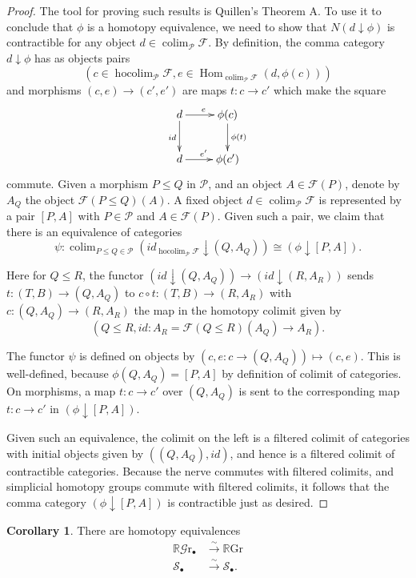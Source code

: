 \documentclass[draftthesis,tocnosub,noragright,centerchapter,10pt]{uiucthesis2009}
\newcommand{\mc}{\mathcal}
\newcommand{\RGr}{\mathbb R\mathrm{Gr}}
\newcommand{\hRGr}{\mathbb R\mathscr{G}{\mathrm{r}}}
\DeclareMathOperator*{\hocolim}{hocolim}
\DeclareMathOperator*{\colim}{colim}
\DeclareMathOperator{\Hom}{Hom}
\theoremstyle{plain}
\theoremstyle{definition}
\newtheorem{corollary}[lemma]{Corollary}
\begin{document}
\begin{proof}
The tool for proving such results is Quillen's Theorem A. To use it to
conclude that $\phi$ is a homotopy equivalence, we need to show that
$N(d \downarrow \phi)$ is contractible for any object $d \in \colim_{\mathscr
  P} \mathscr F$. By definition, the comma category $d \downarrow
\phi$ has as objects pairs 
\[
 (c \in \hocolim_{\mathscr P} \mathscr F, e \in \Hom_{\colim_{\mathscr
  P} \mathscr F}(d, \phi(c)))
\] 
and morphisms $(c,e) \rightarrow (c',e')$ are maps $t: c \rightarrow c'$
which make the square
\[
\xymatrix{d \ar[r]^e \ar[d]_{id} & \phi(c) \ar[d]^{\phi(t)} \\ d \ar[r]^{e'} & \phi(c')} 
\]
commute. Given a morphism $P \leq Q$ in $\mathscr P$, and an object $A
\in \mathscr F(P)$, denote by $A_Q$
the object
$\mathscr F(P\leq Q)(A)$. A fixed object $d \in \colim_{\mathscr
  P} \mathscr F$ is represented by a pair $[P,A]$ with $P \in \mathscr
P$ and $A \in \mathscr F(P)$. Given such a pair, we claim that there
is an equivalence of categories
\[
\psi : \colim_{P \leq Q \in \mathscr P}(id_{\hocolim_{\mathscr P} \mathscr F} \downarrow (Q,A_Q)) \cong (\phi \downarrow [P,A]).
\]

Here for $Q \leq R$, the functor $(id \downarrow (Q,A_Q)) \rightarrow
(id \downarrow (R,A_R))$ sends $t : (T,B) \rightarrow (Q,A_Q)$ to $c
\circ t : (T,B) \rightarrow (R,A_R)$ with $c : (Q,A_Q) \rightarrow
(R,A_R)$ the map in the homotopy colimit given by 
\[
(Q \leq R,id: A_R = \mathscr F(Q \leq R)(A_Q)
\rightarrow A_R).
\]

The functor $\psi$ is defined on objects by $(c,e: c\rightarrow
(Q,A_Q)) \mapsto (c,e)$. This is well-defined, because $\phi(Q,A_Q) =
[P,A]$ by definition of colimit of categories. On morphisms, a map $t:
c \rightarrow c'$ over $(Q,A_Q)$ is sent to the corresponding map $t :
c \rightarrow c'$ in $(\phi \downarrow [P,A])$.

Given such an equivalence, the colimit on the left is a filtered
colimit of categories with initial objects given by $((Q,A_Q),id)$,
and hence is a filtered colimit of contractible
categories. Because the nerve commutes with filtered colimits, and
simplicial homotopy groups commute with filtered colimits, it follows
that the comma category $(\phi \downarrow [P,A])$ is contractible just
as desired.
\end{proof}

\begin{corollary}
There are homotopy equivalences
\begin{align*}
\hRGr_\bullet &\xrightarrow{\sim} \RGr\\
\mathscr S_\bullet &\xrightarrow{\sim} \mc S_\bullet.
\end{align*}
\end{corollary}
\end{document}
